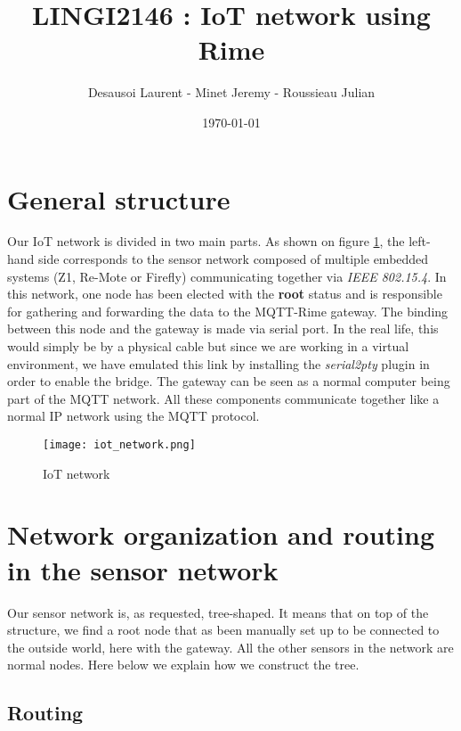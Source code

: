 \documentclass{article}
\title{LINGI2146 : IoT network using Rime}
\author{Desausoi Laurent - Minet Jeremy - Roussieau Julian}
\date{\today}
\begin{document}
\maketitle

\section{General structure}

Our IoT network is divided in two main parts. As shown on figure \ref{network}, the left-hand side corresponds to the sensor network composed of multiple embedded systems (Z1, Re-Mote or Firefly) communicating together via \textit{IEEE 802.15.4}. In this network, one node has been elected with the \textbf{root} status and is responsible for gathering and forwarding the data to the MQTT-Rime gateway. The binding between this node and the gateway is made via serial port. In the real life, this would simply be by a physical cable but since we are working in a virtual environment, we have emulated this link by installing the \textit{serial2pty} plugin in order to enable the bridge. The gateway can be seen as a normal computer being part of the MQTT network. All these components communicate together like a normal IP network using the MQTT protocol.

\begin{center}
    \begin{figure}[!h]
       \texttt{[image: iot\_network.png]}
       \caption{\label{network} IoT network}
    \end{figure}
\end{center}

\section{Network organization and routing in the sensor network}

Our sensor network is, as requested, tree-shaped. It means that on top of the structure, we find a root node that as been manually set up to be connected to the outside world, here with the gateway. All the other sensors in the network are normal nodes. Here below we explain how we construct the tree.

\subsection{Routing}
\end{document}
